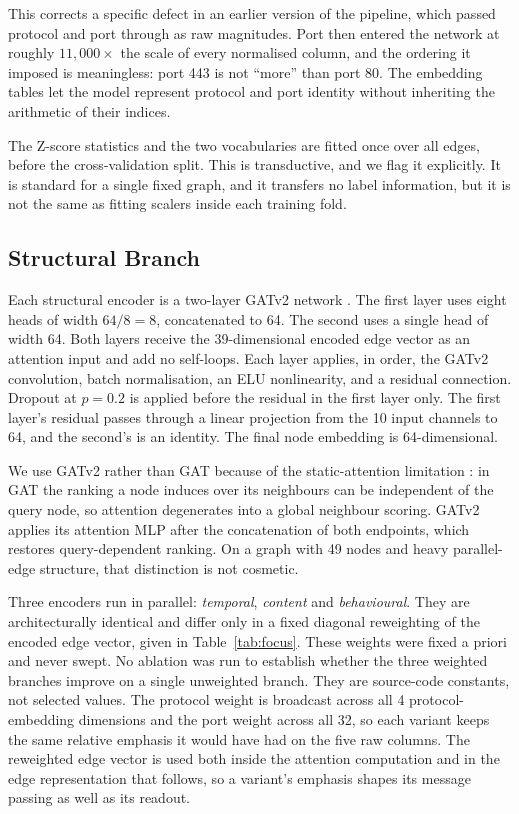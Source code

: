 This corrects a specific defect in an earlier version of the pipeline, which passed protocol
and port through as raw magnitudes. Port then entered the network at roughly $11{,}000\times$
the scale of every normalised column, and the ordering it imposed is meaningless: port 443 is
not ``more'' than port 80. The embedding tables let the model represent protocol and port
identity without inheriting the arithmetic of their indices.

The Z-score statistics and the two vocabularies are fitted once over all edges, before the
cross-validation split. This is transductive, and we flag it explicitly. It is standard for a
single fixed graph, and it transfers no label information, but it is not the same as fitting
scalers inside each training fold.

\subsection{Structural Branch}

Each structural encoder is a two-layer GATv2 network \citep{brody2022gatv2}. The first layer
uses eight heads of width $64/8 = 8$, concatenated to 64. The second uses a single head of
width 64. Both layers receive the 39-dimensional encoded edge vector as an attention input and
add no self-loops. Each layer applies, in order, the GATv2 convolution, batch normalisation,
an ELU nonlinearity, and a residual connection. Dropout at $p = 0.2$ is applied before the
residual in the first layer only. The first layer's residual passes through a linear
projection from the 10 input channels to 64, and the second's is an identity. The final node
embedding is 64-dimensional.

We use GATv2 rather than GAT because of the static-attention limitation
\citep{brody2022gatv2}: in GAT \citep{velickovic2018gat} the ranking a node induces over
its neighbours can be
independent of the query node, so attention degenerates into a global neighbour scoring.
GATv2 applies its attention MLP after the concatenation of both endpoints, which restores
query-dependent ranking. On a graph with 49 nodes and heavy parallel-edge structure, that
distinction is not cosmetic.

Three encoders run in parallel: \emph{temporal}, \emph{content} and \emph{behavioural}.
They are architecturally identical and differ only in a fixed diagonal reweighting of the
encoded edge vector, given in Table~\ref{tab:focus}. These weights were fixed a priori and never swept. No ablation was run to establish whether the three weighted branches improve on a single unweighted branch. They are source-code constants, not selected values. The protocol weight is broadcast across
all 4 protocol-embedding dimensions and the port weight across all 32, so each variant keeps
the same relative emphasis it would have had on the five raw columns. The reweighted edge
vector is used both inside the attention computation and in the edge representation that
follows, so a variant's emphasis shapes its message passing as well as its readout.

